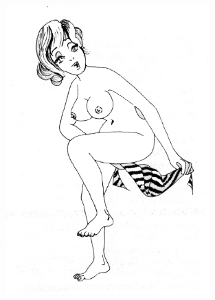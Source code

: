 \bigskip
\begin{figure}[h!]
\centering
   \includegraphics[width=0.7\textwidth]{images/image6.png}
 \end{figure}
 
\breakpage